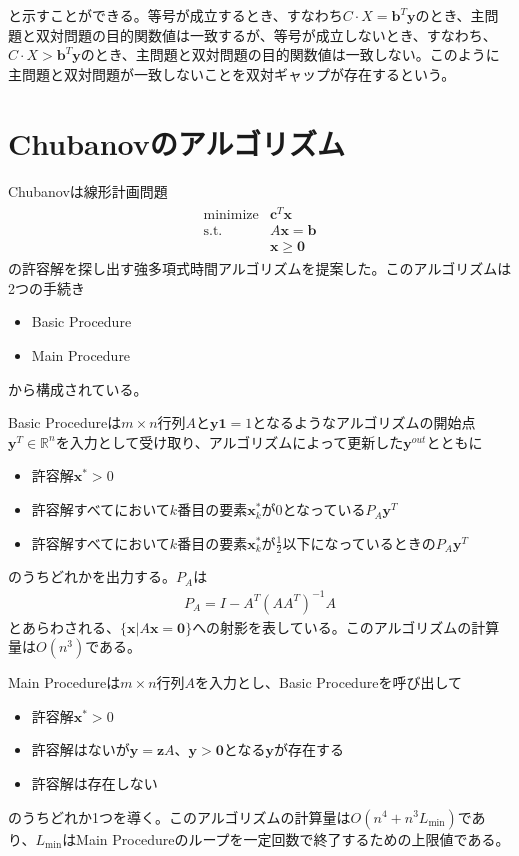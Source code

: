 と示すことができる。等号が成立するとき、すなわち$C \cdot X = \mathbf{b}^T \mathbf{y}$のとき、主問題と双対問題の目的関数値は一致するが、等号が成立しないとき、すなわち、$C \cdot X > \mathbf{b}^T \mathbf{y}$のとき、主問題と双対問題の目的関数値は一致しない。このように主問題と双対問題が一致しないことを双対ギャップが存在するという。


\section{Chubanovのアルゴリズム}
Chubanovは線形計画問題
\begin{align*}
  \begin{array}{ll}
    \text{minimize} & \mathbf{c}^T \mathbf{x} \\
    \text{s.t.}     & A \mathbf{x} = \mathbf{b} \\
                    & \mathbf{x} \geq \mathbf{0}
  \end{array}
\end{align*}
の許容解を探し出す強多項式時間アルゴリズムを提案した。このアルゴリズムは2つの手続き
\begin{itemize}
  \item Basic Procedure
  \item Main Procedure
\end{itemize}
から構成されている。

Basic Procedureは$m \times n$行列$A$と$\mathbf{y} \mathbf{1} = 1$となるようなアルゴリズムの開始点$\mathbf{y}^T \in \mathbb{R}^n$を入力として受け取り、アルゴリズムによって更新した$\mathbf{y}^{out}$とともに
\begin{itemize}
  \item 許容解$\mathbf{x}^* > 0$
  \item 許容解すべてにおいて$k$番目の要素$\mathbf{x}_k^*$が$0$となっている$P_A \mathbf{y}^T$
  \item 許容解すべてにおいて$k$番目の要素$\mathbf{x}_k^*$が$\frac{1}{2}$以下になっているときの$P_A \mathbf{y}^T$
\end{itemize}
のうちどれかを出力する。$P_A$は
\begin{align*}
  P_A = I - A^T (A A^T)^{-1} A
\end{align*}
とあらわされる、$\{\mathbf{x} | A \mathbf{x} = \mathbf{0}\}$への射影を表している。このアルゴリズムの計算量は$O(n^3)$である。

Main Procedureは$m \times n$行列$A$を入力とし、Basic Procedureを呼び出して
\begin{itemize}
  \item 許容解$\mathbf{x}^* > 0$
  \item 許容解はないが$\mathbf{y} = \mathbf{z} A、\mathbf{y} > \mathbf{0}$となる$\mathbf{y}$が存在する
  \item 許容解は存在しない
\end{itemize}
のうちどれか1つを導く。このアルゴリズムの計算量は$O(n^4 + n^3 L_{\text{min}})$であり、$L_{\text{min}}$はMain Procedureのループを一定回数で終了するための上限値である。

